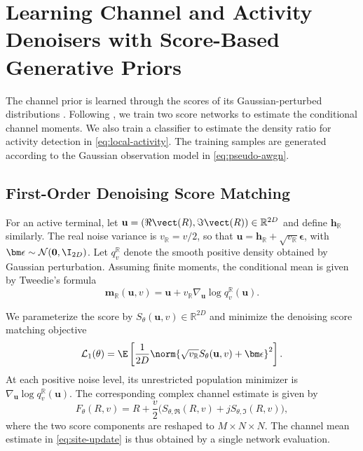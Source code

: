 \section{Learning Channel and Activity Denoisers with Score-Based Generative Priors}
\label{sec:learning}

The channel prior is learned through the scores of its
Gaussian-perturbed distributions \cite{song2019,arvinte2023}.
Following \cite[Sec.~IV]{cai2026}, we train two score networks to
estimate the conditional channel moments. We also train a classifier
to estimate the density ratio for activity detection in \eqref{eq:local-activity}.
The training samples are generated according to the Gaussian
observation model in \eqref{eq:pseudo-awgn}.

\subsection{First-Order Denoising Score Matching}

For an active terminal, let
$\mathbf u=(\Re\vect(R),\Im\vect(R))\in\mathbb R^{2D}$ and define
$\mathbf h_{\mathbb R}$ similarly. The real noise variance is
$v_{\mathbb R}=v/2$, so that
$\mathbf u=\mathbf h_{\mathbb R}+\sqrt{v_{\mathbb R}}\bm\epsilon$,
with $\bm\epsilon\sim\mathcal N(\mathbf0,\I_{2D})$.
Let $q_v^{\mathbb R}$ denote the smooth positive density obtained
by Gaussian perturbation.
Assuming finite moments, the conditional mean is given by Tweedie's formula
\cite{efron2011}
\begin{equation}
 \mathbf m_{\mathbb R}(\mathbf u,v)
 =\mathbf u+v_{\mathbb R}\nabla_{\mathbf u}\log q_v^{\mathbb R}(\mathbf u).
 \label{eq:tweedie-mean}
\end{equation}

We parameterize the score by $S_\theta(\mathbf u,v)\in\mathbb R^{2D}$
and minimize the denoising score matching objective
\cite{song2019,vincent2011}
\begin{equation}
 \mathcal L_1(\theta)=
 \E\left[\frac{1}{2D}
 \norm{\sqrt{v_{\mathbb R}}S_\theta(\mathbf u,v)+\bm\epsilon}^2\right].
 \label{eq:first-loss}
\end{equation}
At each positive noise level, its unrestricted population minimizer is
$\nabla_{\mathbf u}\log q_v^{\mathbb R}(\mathbf u)$.
The corresponding complex channel estimate is given by
\begin{equation}
 F_\theta(R,v)=R+\frac v2
 \big(S_{\theta,\Re}(R,v)+jS_{\theta,\Im}(R,v)\big),
 \label{eq:learned-mean}
\end{equation}
where the two score components are reshaped to $M\times N\times N$.
The channel mean estimate in \eqref{eq:site-update} is thus obtained by a single network evaluation.

